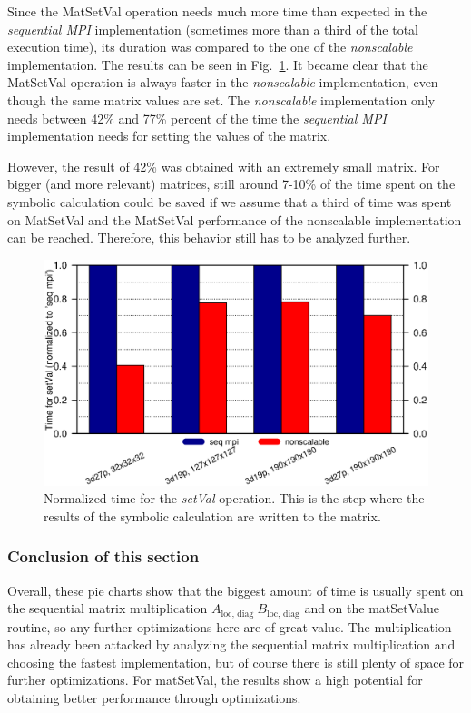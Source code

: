 Since the MatSetVal operation needs much more time than expected in the \textit{sequential MPI} implementation (sometimes more than a third of the total execution time), its duration was compared to the one of the \textit{nonscalable} implementation. The results can be seen in Fig.~\ref{fig:setvalues}. It became clear that the {MatSetVal} operation is always faster in the \textit{nonscalable} implementation, even though the same matrix values are set. The \textit{nonscalable} implementation only needs between 42\% and 77\% percent of the time the \textit{sequential MPI} implementation needs for setting the values of the matrix. 

However, the result of 42\% was obtained with an extremely small matrix. For bigger (and more relevant) matrices, still around 7-10\% of the time spent on the symbolic calculation could be saved if we assume that a third of time was spent on {MatSetVal} and the {MatSetVal} performance of the {nonscalable} implementation can be reached.  Therefore, this behavior still has to be analyzed further.


\begin{figure}[tbp]
	\centering
	\includegraphics[width=1\textwidth, trim={0 2cm 0 7cm},clip]{setvalues}
	\caption{Normalized time for the \textit{setVal} operation. This is the step where the results of the symbolic calculation are written to the matrix.} 
	\label{fig:setvalues}
\end{figure}

\subsubsection*{Conclusion of this section}
Overall, these pie charts show that the biggest amount of time is usually spent on the sequential matrix multiplication $A_{\textrm{loc, diag~}} B_{\textrm{loc, diag}}$ and on the matSetValue routine, so any further optimizations here are of great value. The multiplication has already been attacked by analyzing the sequential matrix multiplication and choosing the fastest implementation, but of course there is still plenty of space for further optimizations. For matSetVal, the results show a high potential for obtaining better performance through optimizations.


